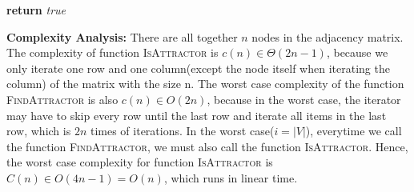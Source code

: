 \documentclass[11pt]{article}
\begin{document}
\begin{enumerate}
\begin{enumerate}
\begin{algorithmic}[1]
			\EndIf
		\EndIf
	\EndFor
		\State \textbf{return} \emph{true}
\EndFunction
\end{algorithmic}
\textbf{Complexity Analysis:} There are all together $n$ nodes in the adjacency matrix. The complexity of function \textsc{IsAttractor} is $c(n)\in \Theta(2n-1)$, because we only iterate one row and one column(except the node itself when iterating the column) of the matrix with the size n. The worst case complexity of the function \textsc{FindAttractor} is also $c(n)\in O(2n)$, because in the worst case, the iterator may have to skip every row until the last row and iterate all items in the last row, which is $2n$ times of iterations. In the worst case($i=|V|$), everytime we call the function \textsc{FindAttractor}, we must also call the function \textsc{IsAttractor}. Hence, the worst case complexity for function \textsc{IsAttractor} is $C(n)\in O(4n-1)=O(n)$, which runs in linear time.
\end{enumerate}

\end{enumerate}
\end{document}
